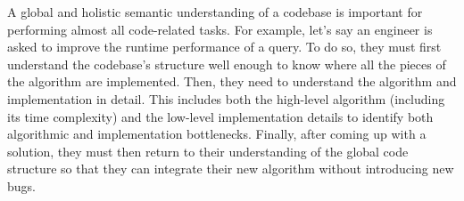 

A global and holistic semantic understanding of a codebase is important for performing almost all code-related tasks. For example, let's say an engineer is asked to improve the runtime performance of a query. To do so, they must first understand the codebase's structure well enough to know where all the pieces of the algorithm are implemented. Then, they need to understand the algorithm and implementation in detail. This includes both the high-level algorithm (including its time complexity) and the low-level implementation details to identify both algorithmic and implementation bottlenecks. Finally, after coming up with a solution, they must then return to their understanding of the global code structure so that they can integrate their new algorithm without introducing new bugs. 





